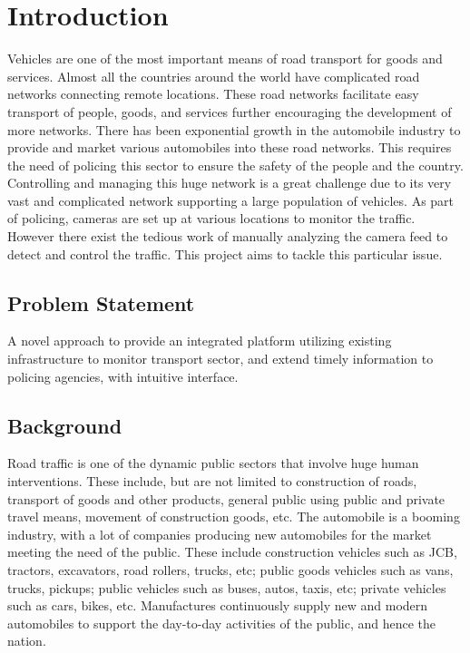 \clearpage
\chapter{Introduction}

Vehicles are one of the most important means of road transport for goods and services. Almost all the countries around the world have complicated road networks connecting remote locations. These road networks facilitate easy transport of people, goods, and services further encouraging the development of more networks. There has been exponential growth in the automobile industry to provide and market various automobiles into these road networks. This requires the need of policing this sector to ensure the safety of the people and the country. Controlling and managing this huge network is a great challenge due to its very vast and complicated network supporting a large population of vehicles. As part of policing, cameras are set up at various locations to monitor the traffic. However there exist the tedious work of manually analyzing the camera feed to detect and control the traffic. This project aims to tackle this particular issue.

\section{Problem Statement}
A novel approach to provide an integrated platform utilizing existing infrastructure to monitor transport sector, and extend timely information to policing agencies, with intuitive interface.

\section{Background}
Road traffic is one of the dynamic public sectors that involve huge human interventions. These include, but are not limited to construction of roads, transport of goods and other products, general public using public and private travel means, movement of construction goods, etc. The automobile is a booming industry, with a lot of companies producing new automobiles for the market meeting the need of the public. These include construction vehicles such as JCB, tractors, excavators, road rollers, trucks, etc; public goods vehicles such as vans, trucks, pickups; public vehicles such as buses, autos, taxis, etc; private vehicles such as cars, bikes, etc. Manufactures continuously supply new and modern automobiles to support the day-to-day activities of the public, and hence the nation.

